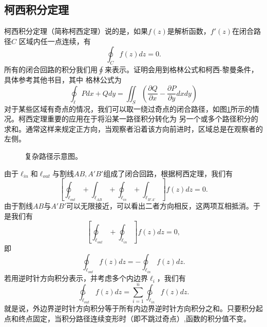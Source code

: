 \subsection{柯西积分定理}
\label{subsec:cauchy_theorem}
柯西积分定理（简称柯西定理）说的是，如果$f(z)$是解析函数，$f'(z)$在闭合路径$C$%
区域内任一点连续，有
\begin{equation}
    \oint_C f(z) dz = 0.
\end{equation}
所有的闭合回路的积分我们用$\oint$来表示。证明会用到格林公式和柯西-黎曼条件，具体参考其他书目，其中
格林公式为
\begin{equation}
    \oint_\ell P dx + Q dy = \iint_S \left( \frac{\partial Q}{\partial x} - \frac{\partial P}{\partial y} dx dy \right)
\end{equation}
对于某些区域有奇点的情况，我们可以取一绕过奇点的闭合路径，如图\ref{fig:complexregion}所示的情况。柯西定理重要的应用在于将沿某一路径积分转化为
另一个或多个路径积分的求和。通常这样来规定正方向，当观察者沿着该方向前进时，区域总是在观察者的左侧。
\begin{figure}
    \centering
    
    \caption{复杂路径示意图。}
    \label{fig:complexregion}
\end{figure}
由于$\ell_{in}$和$\ell_{out}$与割线$AB,A'B'$组成了闭合回路，根据柯西定理，我们有
\[
    \left[ \oint _{\ell_{out}} + \int _{\ell_{AB}} + \oint _{\ell_{in}} + \int _{\ell_{B'A'}} \right] f(z) dz = 0 .
\]   
由于割线$AB$与$A'B'$可以无限接近，可以看出二者方向相反，这两项互相抵消。于是我们有
\[
    \left[ \oint _{\ell_{out}} + \oint _{\ell_{in}}  \right] f(z) dz = 0,
\]
即
\[
    \oint_{\ell_{out}} f(z) dz = - \oint _{\ell_{in}}f(z) dz .
\]
若用逆时针方向积分表示，并考虑多个内边界$\ell_{i}$，我们有
\begin{equation}
    \ointctrclockwise_{\ell_{out}} f(z) dz = \sum_{i=1}^{n} \ointctrclockwise_{\ell_{in}} f(z) dz .
\end{equation}
就是说，外边界逆时针方向积分等于所有内边界逆时针方向积分之和。只要积分起点和终点固定，当积分路径连续变形时（即不跳过奇点）,函数的积分值不变。

